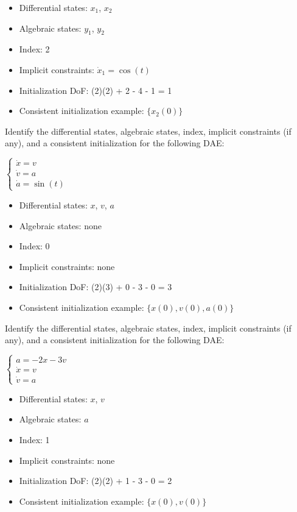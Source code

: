 \begin{solution}
\begin{itemize}
    \item Differential states: $x_1$, $x_2$
    \item Algebraic states: $y_1$, $y_2$
    \item Index: 2
    \item Implicit constraints: $\dot{x}_1 = \cos(t)$
    \item Initialization DoF: (2)(2) + 2 - 4 - 1 = 1
    \item Consistent initialization example: $\{x_2(0)\}$
\end{itemize}
\end{solution}
\begin{exercise}
Identify the differential states, algebraic states, index, implicit constraints (if any), and a consistent initialization for the following DAE:

 $\displaystyle \begin{cases}
    \dot{x} = v \\
    \dot{v} = a \\
    \dot{a} = \sin(t)
    \end{cases}$
\end{exercise}
\begin{solution}
\begin{itemize}
    \item Differential states: $x$, $v$, $a$
    \item Algebraic states: none
    \item Index: 0
    \item Implicit constraints: none
    \item Initialization DoF: (2)(3) + 0 - 3 - 0 = 3
    \item Consistent initialization example: $\{x(0), v(0), a(0)\}$
\end{itemize}
\end{solution}
\begin{exercise}
Identify the differential states, algebraic states, index, implicit constraints (if any), and a consistent initialization for the following DAE:

$\displaystyle \begin{cases}
    a = -2x-3v \\
    \dot{x} = v \\
    \dot{v} = a
    \end{cases}$
\end{exercise}
\begin{solution}
\begin{itemize}
    \item Differential states: $x$, $v$
    \item Algebraic states: $a$
    \item Index: 1
    \item Implicit constraints: none
    \item Initialization DoF: (2)(2) + 1 - 3 - 0 = 2
    \item Consistent initialization example: $\{x(0), v(0)\}$
\end{itemize}
\end{solution}
